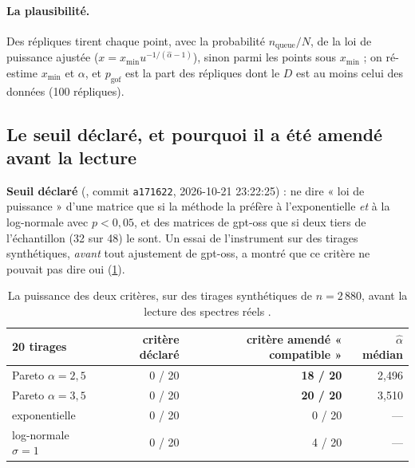 \paragraph{La plausibilité.} Des répliques tirent chaque point, avec la probabilité $n_{\text{queue}}/N$, de la loi de puissance ajustée ($x = x_{\min} u^{-1/(\hat\alpha - 1)}$), sinon parmi les points sous $x_{\min}$ ; on ré-estime $x_{\min}$ et $\alpha$, et $p_{\mathrm{gof}}$ est la part des répliques dont le $D$ est au moins celui des données (100 répliques).

\subsection{Le seuil déclaré, et pourquoi il a été amendé avant la lecture}\label{t3spe:sec:amendement}

\textbf{Seuil déclaré} (, commit \texttt{a171622}, 2026-10-21 23:22:25) : ne dire « loi de puissance » d'une matrice que si la méthode la préfère à l'exponentielle \emph{et} à la log-normale avec $p < 0{,}05$, et des matrices de gpt-oss que si deux tiers de l'échantillon (32 sur 48) le sont. Un essai de l'instrument sur des tirages synthétiques, \emph{avant} tout ajustement de gpt-oss, a montré que ce critère ne pouvait pas dire oui (\cref{t3spe:tab:puissance}).

\begin{table}[tbp]
\centering\small
\caption[La puissance des deux critères]{La puissance des deux critères, sur des tirages synthétiques de $n = 2\,880$, avant la lecture des spectres réels \mes.}
\label{t3spe:tab:puissance}
\begin{tabular}{@{}lrrr@{}}
\toprule
20 tirages & critère déclaré & critère amendé « compatible » & $\hat\alpha$ médian \\
\midrule
Pareto $\alpha = 2{,}5$ & 0 / 20 & \textbf{18 / 20} & 2,496 \\
Pareto $\alpha = 3{,}5$ & 0 / 20 & \textbf{20 / 20} & 3,510 \\
exponentielle & 0 / 20 & 0 / 20 & --- \\
log-normale $\sigma = 1$ & 0 / 20 & 4 / 20 & --- \\
\bottomrule
\end{tabular}
\end{table}

